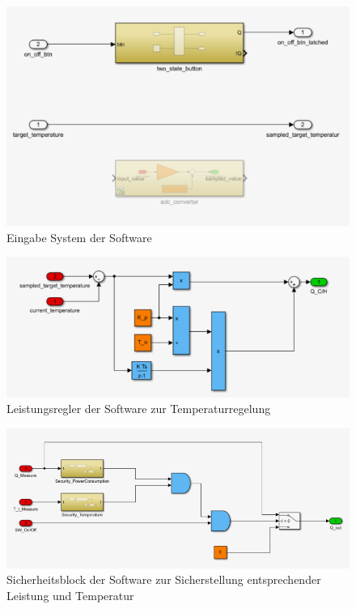 \documentclass[a4paper,12pt]{article}
\begin{document}
	\begin{figure}[h!]
		\centering
		\includegraphics[width=\textwidth]{input_system.png}
		\caption{Eingabe System der Software}
	\end{figure}
	\newpage
	\begin{figure}[h!]
		\centering
		\includegraphics[width=\textwidth]{regler.png}
		\caption{Leistungsregler der Software zur Temperaturregelung}
	\end{figure}
	\begin{figure}[h!]
		\centering
		\includegraphics[width=\textwidth]{security_block.png}
		\caption{Sicherheitsblock der Software zur Sicherstellung entsprechender Leistung und Temperatur}
	\end{figure}
	
\end{document}
